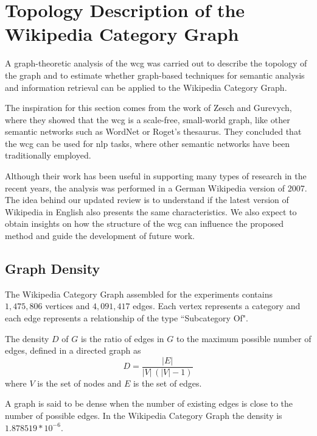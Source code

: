 \chapter{\hspace*{3pt} Topology Description of the Wikipedia Category Graph}


A graph-theoretic analysis of the \gls{wcg} was carried out to describe the topology of the graph and to estimate whether graph-based techniques for semantic analysis and information retrieval can be applied to the Wikipedia Category Graph.

The inspiration for this section comes from the work of Zesch and Gurevych\cite{zesch2007analysis}, where they showed that the \gls{wcg} is a scale-free, small-world graph, like other semantic networks such as WordNet or Roget’s thesaurus. They concluded that the \gls{wcg} can be used for \gls{nlp} tasks, where other semantic networks have been traditionally employed\cite{zesch2007analysis}.

Although their work has been useful in supporting many types of research in the recent years, the analysis was performed in a German Wikipedia version of 2007. The idea behind our updated review is to understand if the latest version of Wikipedia in English also presents the same characteristics. We also expect to obtain insights on how the structure of the \gls{wcg} can influence the proposed method and guide the development of future work.



\section{\hspace*{3pt} Graph Density}

The Wikipedia Category Graph assembled for the experiments contains $1,475,806$ vertices and $4,091,417$ edges. Each vertex represents a category and each edge represents a relationship of the type ``Subcategory Of". 


The density $D$ of $G$ is the ratio of edges in $G$ to the maximum possible number of edges, defined in a directed graph as  
\begin{equation}
D={\frac  {|E|}{|V|\,(|V|-1)}}
\end{equation} where $V$ is the set of nodes and $E$ is the set of edges.

A graph is said to be dense when the number of existing edges is close to the number of possible edges. In the Wikipedia Category Graph the density is $1.878519 * 10^{-6}$.


